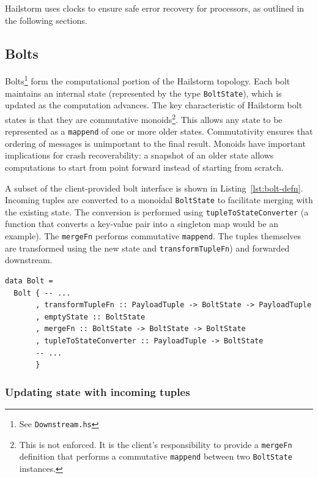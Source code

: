 \documentclass[10pt,nocopyrightspace]{sigplanconf}
\begin{document}
Hailstorm uses clocks to ensure safe error recovery for processors, 
as outlined in the following sections.

\subsection{Bolts}
\label{sec:bolts}

Bolts\footnote{See \texttt{Downstream.hs}} form the computational portion of
the Hailstorm topology. Each bolt maintains an internal state (represented by
the type \lstinline{BoltState}), which is updated as the computation advances.
The key characteristic of Hailstorm bolt states is that they are commutative
monoids\footnote{This is not enforced. It is the client's responsibility to
  provide a \lstinline{mergeFn} definition that performs a commutative
  \lstinline{mappend} between two \lstinline{BoltState} instances.}.  This
  allows any state to be represented as a \lstinline{mappend} of one or more
  older states. Commutativity ensures that ordering of messages is unimportant
  to the final result. Monoids have important implications for crash recoverability:
  a snapshot of an older state allows computations to start 
  from point forward instead of starting from scratch.

A subset of the client-provided bolt interface is shown in
Listing~\ref{lst:bolt-defn}. Incoming tuples are converted to a monoidal
\lstinline{BoltState} to facilitate merging with the existing state. The
conversion is performed using \lstinline{tupleToStateConverter} (a function
that converts a key-value pair into a singleton map would be an example). The
\lstinline{mergeFn} performs commutative \lstinline{mappend}. The tuples
themselves are transformed using the new state and
\lstinline{transformTupleFn}) and forwarded downstream.

\begin{lstlisting}[caption=Client interface for a
bolt,label=lst:bolt-defn,float]
data Bolt =
  Bolt { -- ...
       , transformTupleFn :: PayloadTuple -> BoltState -> PayloadTuple
       , emptyState :: BoltState
       , mergeFn :: BoltState -> BoltState -> BoltState
       , tupleToStateConverter :: PayloadTuple -> BoltState
       -- ...
       }
\end{lstlisting}

\subsubsection{Updating state with incoming tuples}
\label{sec:updating-state}
\end{document}
